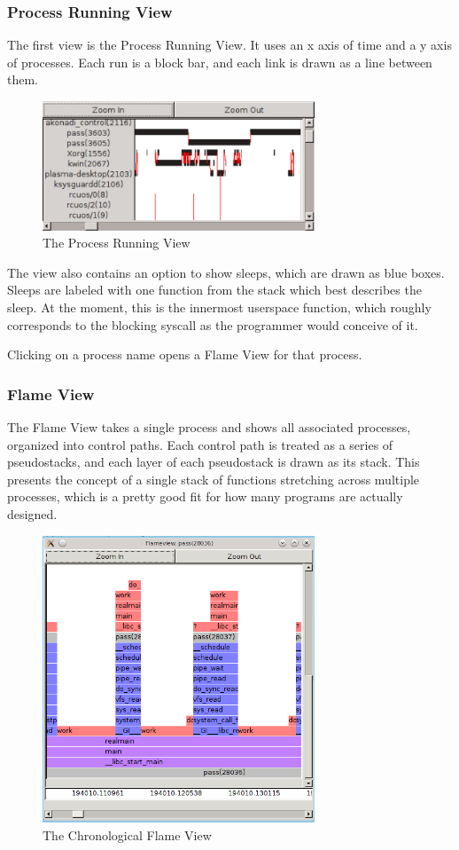 \documentclass[10pt]{article}
\begin{document}
\subsubsection{Process Running View}

The first view is the Process Running View.  It uses an x axis of time and a y axis of processes.  Each run is a block bar, and each link is drawn as a line between them.

\begin{figure}[h!]
\includegraphics[width=3.2in]{images/screenshot}
\caption{The Process Running View}
\end{figure}

The view also contains an option to show sleeps, which are drawn as blue boxes.  Sleeps are labeled with one function from the stack which best describes the sleep.  At the moment, this is the innermost userspace function, which roughly corresponds to the blocking syscall as the programmer would conceive of it.

Clicking on a process name opens a Flame View for that process.

\subsubsection{Flame View}

The Flame View takes a single process and shows all associated processes, organized into control paths.  Each control path is treated as a series of pseudostacks, and each layer of each pseudostack is drawn as its stack.  This presents the concept of a single stack of functions stretching across multiple processes, which is a pretty good fit for how many programs are actually designed.

\begin{figure}[h!]
\includegraphics[width=3.2in]{images/flameshot}
\caption{The Chronological Flame View}
\end{figure}
\end{document}
